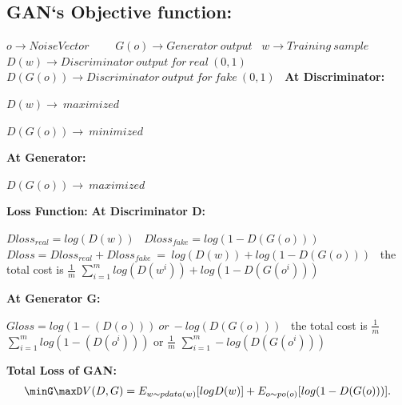 \documentclass[runningheads]{llncs}
\begin{document}
\subsection{\textbf{GAN`s Objective function:}}
\newline
\begin{itemize}
    $o\rightarrow Noise Vector$\ ~~~ $G(o)\rightarrow Generator~  output$\
    \newline
    $w\rightarrow Training~sample$\ 
    \newline
    $D(w)\rightarrow Discriminator~ output~ for~ real ~(0,1) $\
    \newline
    $D(G(o))\rightarrow Discriminator~ output~ for~ fake ~(0,1) $\
    \newline
    \newline
    \textbf{At Discriminator:}
    \newline
    \newline
    \newline
    \textbf{At Generator:}
    \begin{itemize}
        \newline
        $D(G(o))\rightarrow ~maximized$\
    \end{itemize}
    
\end{itemize}
\textbf{Loss Function:}
\newline
\textbf{At Discriminator D:}
\newline
\begin{itemize}
$Dloss_{real}=log(D(w))$\
\newline
$Dloss_{fake}=log(1-D(G(o)))$\
\newline
$Dloss=Dloss_{real}+Dloss_{fake}~=~log(D(w))+log(1-D(G(o)))$\
\newline
the total cost is 
\newline
\( \frac{1}{m} \) $\sum_{i=1}^{m} log(D(w^i))+log(1-D(G(o^i)))$ 
\end{itemize}
\newline
\newline
\textbf{At Generator G:}
\newline
\begin{itemize}
$Gloss=log(1-(D(o))) ~or~ -log(D(G(o)))$\
\newline
the total cost is 
\newline
\( \frac{1}{m} \) $\sum_{i=1}^{m} log(1-(D(o^i)))$
or
\newline
\newline
\( \frac{1}{m} \) $\sum_{i=1}^{m} -log(D(G(o^i)))$
\end{itemize}
\newline
\textbf{Total Loss of GAN:}
\[ \minG  \maxD  V (D, G)=E _{w \sim pdata(w)}[log D(w)] + E _{o \sim p o(o)} [log(1-D(G(o)))]. \]
\end{document}
